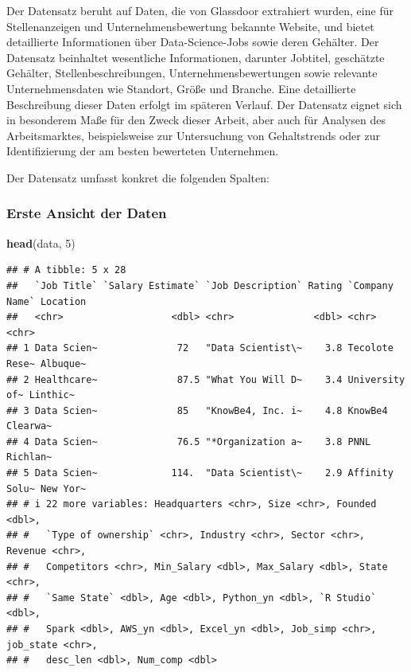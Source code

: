 \documentclass[
]{article}
\newenvironment{Shaded}{\begin{snugshade}}{\end{snugshade}}
\newcommand{\DecValTok}[1]{\textcolor[rgb]{0.00,0.00,0.81}{#1}}
\newcommand{\FunctionTok}[1]{\textcolor[rgb]{0.13,0.29,0.53}{\textbf{#1}}}
\newcommand{\NormalTok}[1]{#1}
\begin{document}
Der Datensatz beruht auf Daten, die von Glassdoor extrahiert wurden,
eine für Stellenanzeigen und Unternehmensbewertung bekannte Website, und
bietet detaillierte Informationen über Data-Science-Jobs sowie deren
Gehälter. Der Datensatz beinhaltet wesentliche Informationen, darunter
Jobtitel, geschätzte Gehälter, Stellenbeschreibungen,
Unternehmensbewertungen sowie relevante Unternehmensdaten wie Standort,
Größe und Branche. Eine detaillierte Beschreibung dieser Daten erfolgt
im späteren Verlauf. Der Datensatz eignet sich in besonderem Maße für
den Zweck dieser Arbeit, aber auch für Analysen des Arbeitsmarktes,
beispielsweise zur Untersuchung von Gehaltstrends oder zur
Identifizierung der am besten bewerteten Unternehmen.

Der Datensatz umfasst konkret die folgenden Spalten:

\subsubsection{Erste Ansicht der Daten}\label{erste-ansicht-der-daten}

\begin{Shaded}
\begin{Highlighting}[]
\FunctionTok{head}\NormalTok{(data, }\DecValTok{5}\NormalTok{)}
\end{Highlighting}
\end{Shaded}

\begin{verbatim}
## # A tibble: 5 x 28
##   `Job Title` `Salary Estimate` `Job Description` Rating `Company Name` Location
##   <chr>                   <dbl> <chr>              <dbl> <chr>          <chr>   
## 1 Data Scien~              72   "Data Scientist\~    3.8 Tecolote Rese~ Albuque~
## 2 Healthcare~              87.5 "What You Will D~    3.4 University of~ Linthic~
## 3 Data Scien~              85   "KnowBe4, Inc. i~    4.8 KnowBe4        Clearwa~
## 4 Data Scien~              76.5 "*Organization a~    3.8 PNNL           Richlan~
## 5 Data Scien~             114.  "Data Scientist\~    2.9 Affinity Solu~ New Yor~
## # i 22 more variables: Headquarters <chr>, Size <chr>, Founded <dbl>,
## #   `Type of ownership` <chr>, Industry <chr>, Sector <chr>, Revenue <chr>,
## #   Competitors <chr>, Min_Salary <dbl>, Max_Salary <dbl>, State <chr>,
## #   `Same State` <dbl>, Age <dbl>, Python_yn <dbl>, `R Studio` <dbl>,
## #   Spark <dbl>, AWS_yn <dbl>, Excel_yn <dbl>, Job_simp <chr>, job_state <chr>,
## #   desc_len <dbl>, Num_comp <dbl>
\end{verbatim}
\end{document}
